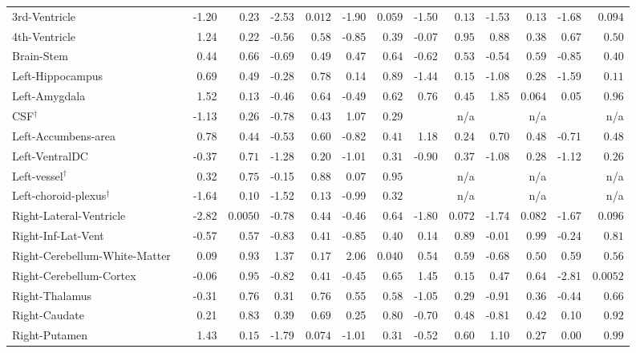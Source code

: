 {\begin{longtable}{llrrrrrrrrrrrr}
3rd-Ventricle &  & -1.20 & $0.23$ & -2.53 & $0.012$ & -1.90 & $0.059$ & -1.50 & $0.13$ & -1.53 & $0.13$ & -1.68 & $0.094$ \\
4th-Ventricle &  & 1.24 & $0.22$ & -0.56 & $0.58$ & -0.85 & $0.39$ & -0.07 & $0.95$ & 0.88 & $0.38$ & 0.67 & $0.50$ \\
Brain-Stem &  & 0.44 & $0.66$ & -0.69 & $0.49$ & 0.47 & $0.64$ & -0.62 & $0.53$ & -0.54 & $0.59$ & -0.85 & $0.40$ \\
Left-Hippocampus &  & 0.69 & $0.49$ & -0.28 & $0.78$ & 0.14 & $0.89$ & -1.44 & $0.15$ & -1.08 & $0.28$ & -1.59 & $0.11$ \\
Left-Amygdala &  & 1.52 & $0.13$ & -0.46 & $0.64$ & -0.49 & $0.62$ & 0.76 & $0.45$ & 1.85 & $0.064$ & 0.05 & $0.96$ \\
CSF$^{\dagger}$ &  & -1.13 & $0.26$ & -0.78 & $0.43$ & 1.07 & $0.29$ &  & n/a &  & n/a &  & n/a \\
Left-Accumbens-area &  & 0.78 & $0.44$ & -0.53 & $0.60$ & -0.82 & $0.41$ & 1.18 & $0.24$ & 0.70 & $0.48$ & -0.71 & $0.48$ \\
Left-VentralDC &  & -0.37 & $0.71$ & -1.28 & $0.20$ & -1.01 & $0.31$ & -0.90 & $0.37$ & -1.08 & $0.28$ & -1.12 & $0.26$ \\
Left-vessel$^{\dagger}$ &  & 0.32 & $0.75$ & -0.15 & $0.88$ & 0.07 & $0.95$ &  & n/a &  & n/a &  & n/a \\
Left-choroid-plexus$^{\dagger}$ &  & -1.64 & $0.10$ & -1.52 & $0.13$ & -0.99 & $0.32$ &  & n/a &  & n/a &  & n/a \\
Right-Lateral-Ventricle &  & -2.82 & $0.0050$ & -0.78 & $0.44$ & -0.46 & $0.64$ & -1.80 & $0.072$ & -1.74 & $0.082$ & -1.67 & $0.096$ \\
Right-Inf-Lat-Vent &  & -0.57 & $0.57$ & -0.83 & $0.41$ & -0.85 & $0.40$ & 0.14 & $0.89$ & -0.01 & $0.99$ & -0.24 & $0.81$ \\
Right-Cerebellum-White-Matter &  & 0.09 & $0.93$ & 1.37 & $0.17$ & 2.06 & $0.040$ & 0.54 & $0.59$ & -0.68 & $0.50$ & 0.59 & $0.56$ \\
Right-Cerebellum-Cortex &  & -0.06 & $0.95$ & -0.82 & $0.41$ & -0.45 & $0.65$ & 1.45 & $0.15$ & 0.47 & $0.64$ & -2.81 & $0.0052$ \\
Right-Thalamus &  & -0.31 & $0.76$ & 0.31 & $0.76$ & 0.55 & $0.58$ & -1.05 & $0.29$ & -0.91 & $0.36$ & -0.44 & $0.66$ \\
Right-Caudate &  & 0.21 & $0.83$ & 0.39 & $0.69$ & 0.25 & $0.80$ & -0.70 & $0.48$ & -0.81 & $0.42$ & 0.10 & $0.92$ \\
Right-Putamen &  & 1.43 & $0.15$ & -1.79 & $0.074$ & -1.01 & $0.31$ & -0.52 & $0.60$ & 1.10 & $0.27$ & 0.00 & $0.99$ \\

\end{longtable}}
